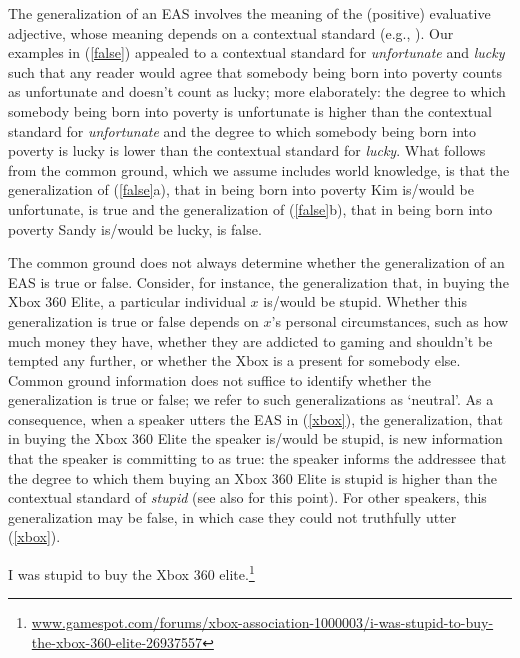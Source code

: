 \documentclass[11pt,fleqn]{article}
\newcommand{\6}{\mbox{$[\hspace*{-.6mm}[$}}
\newcommand{\9}{\mbox{$]\hspace*{-.6mm}]$}}
\begin{document}
The generalization of an EAS involves the meaning of the (positive) evaluative adjective, whose meaning depends on a contextual standard (e.g., \citealt{kennedy2001}). Our examples in (\ref{false}) appealed to a contextual standard for {\em unfortunate} and {\em lucky} such that any reader would agree that somebody being born into poverty counts as unfortunate and doesn't count as lucky; more elaborately: the degree to which somebody being born into poverty is unfortunate is higher than the contextual standard for {\em unfortunate} and the degree to which somebody being born into poverty is lucky is lower than the contextual standard for {\em lucky}. What follows from the common ground, which we assume includes world knowledge, is that the generalization of (\ref{false}a), that in being born into poverty Kim is/would be unfortunate, is true and the generalization of (\ref{false}b), that in being born into poverty Sandy is/would be lucky, is false. 

The common ground does not always determine whether the generalization of an EAS is true or false. Consider, for instance, the generalization that, in buying the Xbox 360 Elite, a particular individual $x$ is/would be stupid. Whether this generalization is true or false depends on $x$'s personal circumstances, such as how much money they have, whether they are addicted to gaming and shouldn't be tempted any further, or whether the Xbox is a present for somebody else. Common ground information does not suffice to identify whether the generalization is true or false; we refer to such generalizations as `neutral'. As a consequence, when a speaker utters the EAS in (\ref{xbox}), the generalization, that in buying the Xbox 360 Elite the speaker is/would be stupid, is new information that the speaker is committing to as true: the speaker informs the addressee that the degree to which them buying an Xbox 360 Elite is stupid is higher than the contextual standard of {\em stupid} (see also \citealt{barker02} for this point). For other speakers, this generalization may be false, in which case they could not truthfully utter (\ref{xbox}).

\begin{exe}
\ex\label{xbox} I was stupid to buy the Xbox 360 elite.\footnote{\url{www.gamespot.com/forums/xbox-association-1000003/i-was-stupid-to-buy-the-xbox-360-elite-26937557}}
\end{exe}
\end{document}
